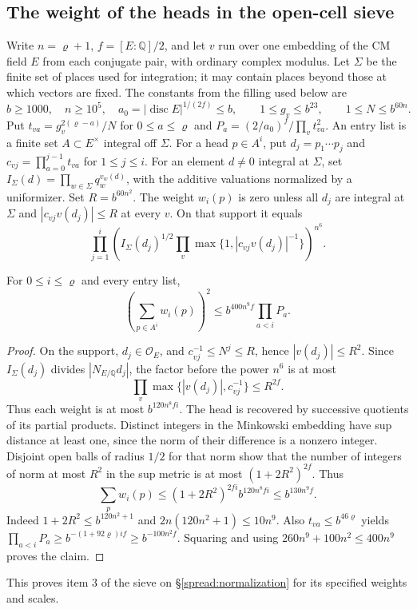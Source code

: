 \subsection*{The weight of the heads in the open-cell sieve}
Write $n=\varrho+1$, $f=[E:\mathbb Q]/2$, and let $v$ run over one embedding of the CM field $E$ from each conjugate pair, with ordinary complex modulus. Let $\Sigma$ be the finite set of places used for integration; it may contain places beyond those at which vectors are fixed. The constants from the filling used below are
\[
 b\ge1000,\quad n\ge 10^5,\quad a_0=|\operatorname{disc}E|^{1/(2f)}\le b,\qquad
 1\le g_v\le b^{23},\qquad 1\le N\le b^{60n}.
\]
Put $t_{va}=g_v^{2(\varrho-a)}/N$ for $0\le a\le\varrho$ and $P_a=(2/a_0)^f/\prod_v t_{va}^2$. An entry list is a finite set $A\subset E^\times$ integral off $\Sigma$. For a head $p\in A^i$, put $d_j=p_1\cdots p_j$ and $c_{vj}=\prod_{a=0}^{j-1}t_{va}$ for $1\le j\le i$. For an element $d\ne0$ integral at $\Sigma$, set $I_\Sigma(d)=\prod_{w\in \Sigma} q_w^{v_w(d)}$, with the additive valuations normalized by a uniformizer. Set $R=b^{60n^2}$.
The weight $w_i(p)$ is zero unless all $d_j$ are integral at $\Sigma$ and $|c_{vj}v(d_j)|\le R$ at every $v$. On that support it equals
\[
 \prod_{j=1}^i\left(I_\Sigma(d_j)^{1/2}\prod_v\max\{1,|c_{vj}v(d_j)|^{-1}\}\right)^{n^6}.
\]
\begin{lemma}
For $0\le i\le\varrho$ and every entry list,
\[
 \left(\sum_{p\in A^i}w_i(p)\right)^2
 \le b^{400n^9f}\prod_{a<i}P_a .
\]
\end{lemma}
\begin{proof}
On the support, $d_j\in\mathcal O_E$, and $c_{vj}^{-1}\le N^j\le R$, hence $|v(d_j)|\le R^2$. Since $I_\Sigma(d_j)$ divides $|N_{E/\mathbb Q}d_j|$, the factor before the power $n^6$ is at most
\[
 \prod_v\max\{|v(d_j)|,c_{vj}^{-1}\}\le R^{2f}.
\]
Thus each weight is at most $b^{120n^8fi}$. The head is recovered by successive quotients of its partial products. Distinct integers in the Minkowski embedding have sup distance at least one, since the norm of their difference is a nonzero integer. Disjoint open balls of radius $1/2$ for that norm show that the number of integers of norm at most $R^2$ in the sup metric is at most $(1+2R^2)^{2f}$. Thus
\[
 \sum_p w_i(p)\le (1+2R^2)^{2fi} b^{120n^8fi}\le b^{130n^9f}.
\]
Indeed $1+2R^2\le b^{120n^2+1}$ and $2n(120n^2+1)\le10n^9$. Also $t_{va}\le b^{46\varrho}$ yields $\prod_{a<i}P_a\ge b^{-(1+92\varrho)if}\ge b^{-100n^2f}$. Squaring and using $260n^9+100n^2\le400n^9$ proves the claim.
\end{proof}
This proves item 3 of the sieve on \S\ref{spread:normalization} for its specified weights and scales.

